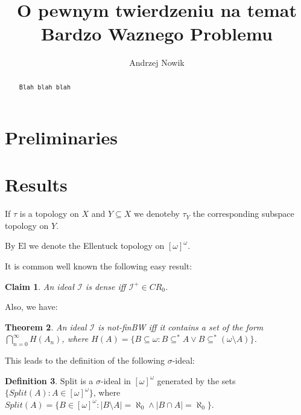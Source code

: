 \documentclass[12pt]{amsart}
\author{Andrzej Nowik}
\theoremstyle{plain}
\newtheorem{theorem}{Theorem}[section]
\newtheorem{claim}[theorem]{Claim}
\theoremstyle{definition}
\newtheorem{definition}[theorem]{Definition}
\theoremstyle{remark}
\newcommand{\dummy}{{\tt Blah blah blah}}
\newcommand{\infsub}{[\omega]^{\omega}}
\newcommand{\calI}{\mathcal{I}}
\newcommand{\EllentuckTopology}{\mathrm{El}}
\begin{document}
\title[
O pewnym twierdzeniu...
]{
O pewnym twierdzeniu na temat Bardzo Waznego Problemu
}

\begin{abstract}
\dummy
\end{abstract}

\maketitle

\section{Preliminaries}

\section{Results}


If $\tau$ is a topology on $X$ and $Y \subseteq X$ 
we denoteby $\tau_Y$ the corresponding subspace topology on $Y$.

By $\EllentuckTopology$ we denote the Ellentuck topology on $\infsub$.

It is common well known the following easy result:
\begin{claim}
An ideał $\calI$ is dense iff $\calI^+ \in CR_0$.
\end{claim}

Also, we have: 
\begin{theorem}
An ideal $\calI$ is not-finBW iff it contains a set of the form
$\bigcap_{n=0}^\infty H(A_n)$, where
 $H(A) = \lbrace B \subseteq \omega \colon B \subseteq^* A \vee B \subseteq^* (\omega\setminus A)\rbrace$.
\end{theorem}

This leads to the definition of the following $\sigma$-ideal:

\begin{definition}
$\mathrm{Split}$ is a $\sigma$-ideal in
$\infsub$ generated by the sets
\linebreak $\lbrace \mathit{Split}(A) \colon A \in \infsub \rbrace$,
where  
$\mathit{Split}(A) = 
\lbrace B \in \infsub \colon |B \setminus A| = \aleph_0 \wedge |B \cap A| = \aleph_0\rbrace$.
\end{definition}
\end{document}
